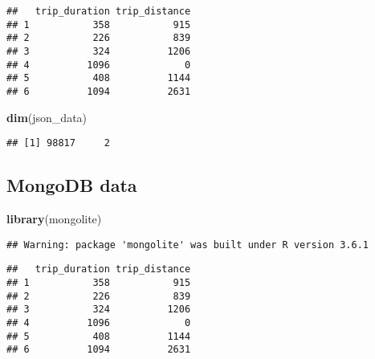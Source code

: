 \documentclass[]{article}
\newenvironment{Shaded}{\begin{snugshade}}{\end{snugshade}}
\newcommand{\KeywordTok}[1]{\textcolor[rgb]{0.13,0.29,0.53}{\textbf{#1}}}
\newcommand{\DataTypeTok}[1]{\textcolor[rgb]{0.13,0.29,0.53}{#1}}
\newcommand{\StringTok}[1]{\textcolor[rgb]{0.31,0.60,0.02}{#1}}
\newcommand{\CommentTok}[1]{\textcolor[rgb]{0.56,0.35,0.01}{\textit{#1}}}
\newcommand{\OperatorTok}[1]{\textcolor[rgb]{0.81,0.36,0.00}{\textbf{#1}}}
\newcommand{\NormalTok}[1]{#1}
\begin{document}
\begin{verbatim}
##   trip_duration trip_distance
## 1           358           915
## 2           226           839
## 3           324          1206
## 4          1096             0
## 5           408          1144
## 6          1094          2631
\end{verbatim}

\begin{Shaded}
\begin{Highlighting}[]
\KeywordTok{dim}\NormalTok{(json_data)}
\end{Highlighting}
\end{Shaded}

\begin{verbatim}
## [1] 98817     2
\end{verbatim}

\subsection{MongoDB data}\label{mongodb-data}

\begin{Shaded}
\begin{Highlighting}[]
\KeywordTok{library}\NormalTok{(mongolite)}
\end{Highlighting}
\end{Shaded}

\begin{verbatim}
## Warning: package 'mongolite' was built under R version 3.6.1
\end{verbatim}

\begin{Shaded}
\end{Shaded}

\begin{verbatim}
##   trip_duration trip_distance
## 1           358           915
## 2           226           839
## 3           324          1206
## 4          1096             0
## 5           408          1144
## 6          1094          2631
\end{verbatim}
\end{document}
